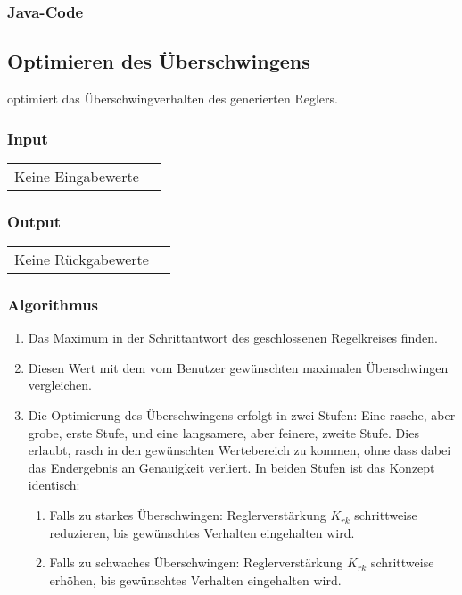\clearpage
\subsubsection*{Java-Code}



\clearpage
\subsection{Optimieren des \"Uberschwingens}
\label{app:algo:oversh}

   optimiert   das  \"Uberschwingverhalten   des
generierten Reglers.

\subsubsection*{Input}

\begin{tabular}{p{40mm}l}
    Keine Eingabewerte &
\end{tabular}

\subsubsection*{Output}
\begin{tabular}{p{40mm}l}
    Keine R\"uckgabewerte &
\end{tabular}

\subsubsection*{Algorithmus}
\begin{enumerate}
    \item
        Das Maximum in der Schrittantwort des geschlossenen Regelkreises finden.
    \item
        Diesen Wert mit dem vom Benutzer gew\"unschten maximalen \"Uberschwingen vergleichen.
    \item
        Die  Optimierung des  \"Uberschwingens  erfolgt  in zwei  Stufen: Eine
        rasche, aber  grobe, erste Stufe,  und eine langsamere,  aber feinere,
        zweite Stufe.   Dies erlaubt, rasch in  den gew\"unschten Wertebereich
        zu kommen, ohne dass dabei das Endergebnis an Genauigkeit verliert. In
        beiden Stufen ist das Konzept identisch:
    \begin{enumerate}
        \item
            Falls  zu  starkes  \"Uberschwingen: Reglerverst\"arkung  $K_{rk}$
            schrittweise reduzieren,  bis gew\"unschtes  Verhalten eingehalten
            wird.
        \item
            Falls  zu schwaches  \"Uberschwingen: Reglerverst\"arkung $K_{rk}$
            schrittweise  erh\"ohen, bis  gew\"unschtes Verhalten  eingehalten
            wird.
    \end{enumerate}
\end{enumerate}

